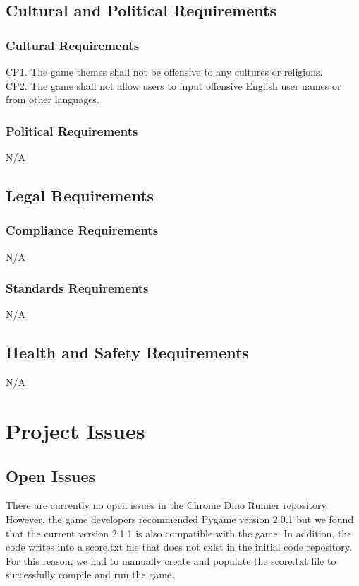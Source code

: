 \documentclass[12pt]{article}
\begin{document}
\subsection{Cultural and Political Requirements}
    \subsubsection{Cultural Requirements}
    CP1. The game themes shall not be offensive to any cultures or religions. \\
    CP2. The game shall not allow users to input offensive English user names or from other languages.

    \subsubsection{Political Requirements}    N/A
    
\subsection{Legal Requirements}
    \subsubsection{Compliance Requirements}
    N/A
    
    \subsubsection{Standards Requirements} 
    N/A
    
\subsection{Health and Safety Requirements}
    N/A
    
    
\section{Project Issues}
\subsection{Open Issues}
There are currently no open issues in the Chrome Dino Runner repository.
However, the game developers recommended Pygame version 2.0.1 but we found that the current version 2.1.1 is also compatible with the game.
In addition, the code writes into a score.txt file that does not exist in the initial code repository. For this reason, we had to manually create and populate the score.txt file to successfully compile and run the game.
\end{document}
